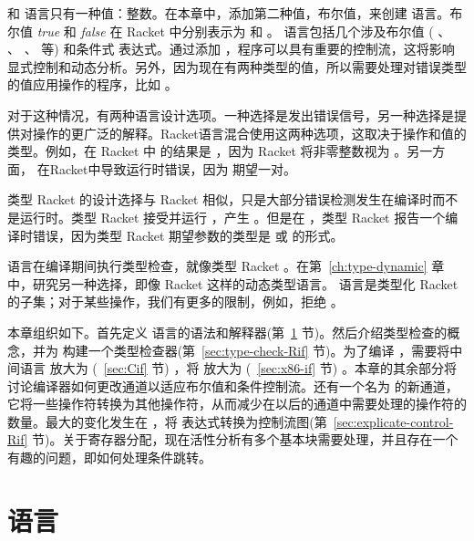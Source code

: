 \documentclass[11pt]{book}
\begin{document}
 \LangInt{} 和 \LangVar{} 语言只有一种值：整数。在本章中，添加第二种值，布尔值，来创建 \LangIf{} 语言。布尔值
\emph{true} 和 \emph{false} 在 Racket 中分别表示为  和 
。 \LangIf{} 语言包括几个涉及布尔值 ( 、 、
、\key{<} 等) 和条件式  表达式。通过添加  ，程序可以具有重要的控制流，这将影响显式控制和动态分析。另外，因为现在有两种类型的值，所以需要处理对错误类型的值应用操作的程序，比如  。

对于这种情况，有两种语言设计选项。一种选择是发出错误信号，另一种选择是提供对操作的更广泛的解释。Racket语言混合使用这两种选项，这取决于操作和值的类型。例如，在 Racket 中 的结果是
 ，因为 Racket 将非零整数视为
 。另一方面，  在Racket中导致运行时错误，因为  期望一对。

类型 Racket 的设计选择与 Racket 相似，只是大部分错误检测发生在编译时而不是运行时。类型
Racket 接受并运行  ，产生  。但是在  ，类型 Racket 报告一个编译时错误，因为类型 Racket 期望参数的类型是  或  的形式。

 \LangIf{} 语言在编译期间执行类型检查，就像类型 Racket 。在第~\ref{ch:type-dynamic} 章中，研究另一种选择，即像 Racket 这样的动态类型语言。
 \LangIf{} 语言是类型化 Racket 的子集；对于某些操作，我们有更多的限制，例如，拒绝
 。

本章组织如下。首先定义 \LangIf{} 语言的语法和解释器(第~\ref{sec:lang-if} 节)。然后介绍类型检查的概念，并为 \LangIf{}
构建一个类型检查器(第~\ref{sec:type-check-Rif} 节)。为了编译 \LangIf{} ，需要将中间语言 \LangCVar{} 放大为 \LangCIf{}
(~\ref{sec:Cif} 节) ，将 \LangXInt{} 放大为 \LangXIf{}
(~\ref{sec:x86-if} 节) 。本章的其余部分将讨论编译器如何更改通道以适应布尔值和条件控制流。还有一个名为 的新通道，它将一些操作符转换为其他操作符，从而减少在以后的通道中需要处理的操作符的数量。最大的变化发生在  ，将
 表达式转换为控制流图(第~\ref{sec:explicate-control-Rif} 节)。关于寄存器分配，现在活性分析有多个基本块需要处理，并且存在一个有趣的问题，即如何处理条件跳转。


\section{ \LangIf{} 语言}
\label{sec:lang-if}
\end{document}
